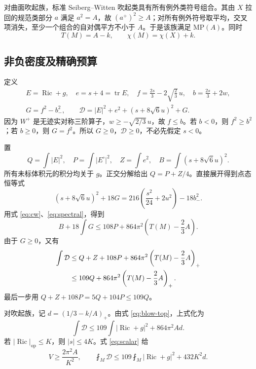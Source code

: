 \documentclass[UTF8,fontset=fandol,zihao=-4]{ctexart}
\theoremstyle{cn}
\DeclareMathOperator{\Ric}{Ric}
\DeclareMathOperator{\tr}{tr}
\newcommand{\op}{\mathrm{op}}
\newcommand{\av}{\fint}
\newcommand{\Dcal}{\mathcal D}
\numberwithin{equation}{section}
\begin{document}
对曲面吹起族，标准 Seiberg--Witten 吹起类具有所有例外类符号组合。其由 $X$ 拉回的规范类部分 $a$ 满足 $a^2=A$，故 $(a^+)^2\ge A$；对所有例外符号取平均，交叉项消失，至少一个组合的自对偶平方不小于 $A$。于是该族满足 $\mathrm{MP}(A)$。同时
\begin{equation}\label{eq:blow-top}
T(M)=A-k,\qquad \chi(M)=\chi(X)+k.
\end{equation}

\subsection{非负密度及精确预算}

定义
\begin{gather}
E=\Ric+g,\quad e=s+4=\tr E,\quad
f=\frac{2s}{3}-2\sqrt{\frac23}\,u,\quad b=\frac{2s}{3}+2w,\label{eq:defs}\\
G=f^2-b_-^2,\qquad
\Dcal=|E|^2+e^2+(s+8\sqrt6u)^2+G.\label{eq:density}
\end{gather}
因为 $W^+$ 是无迹实对称三阶算子，$w\ge-\sqrt{2/3}\,u$，故 $f\le b$。若 $b<0$，则 $f^2\ge b^2$；若 $b\ge0$，则 $G=f^2$。所以 $G\ge0$，$\Dcal\ge0$，不必先假定 $s<0$。

置
\[
Q=\int|E|^2,\quad P=\int|E^\circ|^2,\quad
Z=\int e^2,\quad B=\int(s+8\sqrt6u)^2.
\]
所有未标体积元的积分均关于 $g$。正交分解给出 $Q=P+Z/4$。直接展开得到点态恒等式
\begin{equation}\label{eq:calibration}
(s+8\sqrt6u)^2+18G
=216\left(\frac{s^2}{24}+2u^2\right)-18b_-^2.
\end{equation}
用式 \eqref{eq:cw}、\eqref{eq:spectral}，得到
\begin{equation}\label{eq:budget-raw}
B+18\int G\le108P+864\pi^2\left(T(M)-\frac23A\right).
\end{equation}
由于 $G\ge0$，又有
\begin{align}
\int\Dcal
&\le Q+Z+108P+864\pi^2\left(T(M)-\frac23A\right)_+\notag\\
&\le109Q+864\pi^2\left(T(M)-\frac23A\right)_+.\label{eq:budget-general}
\end{align}
最后一步用 $Q+Z+108P=5Q+104P\le109Q$。

对吹起族，记 $d=(1/3-k/A)_+$。由式 \eqref{eq:blow-top}，上式化为
\begin{equation}\label{eq:budget-blow}
\int\Dcal\le109\int|\Ric+g|^2+864\pi^2Ad.
\end{equation}
若 $|\Ric|_{\op}\le K$，则 $|s|\le4K$。式 \eqref{eq:scalar} 给
\begin{equation}\label{eq:l2-budget}
V\ge\frac{2\pi^2A}{K^2},\qquad
\av_M\Dcal\le109\av_M|\Ric+g|^2+432K^2d.
\end{equation}
\end{document}

